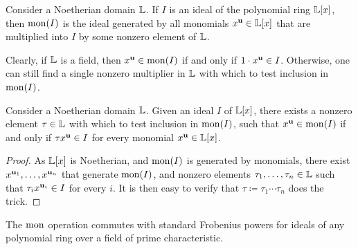 \documentclass{amsart}
\begin{document}
\begin{definition}
\label{monomialization: D}
Consider a Noetherian domain $\mathbb{L}$.  If $I$ is an ideal of the polynomial ring $\mathbb{L}[x]$, then $\operatorname{mon}(I)$ is the ideal generated by all monomials $x^{\mathbf{u}} \in \mathbb{L}[x]$ that are multiplied into $I$ by some nonzero element of $\mathbb{L}$.
\end{definition}

Clearly, if $\mathbb{L}$ is a field, then $x^{\mathbf{u}} \in \operatorname{mon}(I)$ if and only if $1 \cdot x^{\mathbf{u}} \in I$.  Otherwise, one can still find a single nonzero multiplier in $\mathbb{L}$ with which to test inclusion in $\operatorname{mon}(I)$.  

\begin{lemma}
\label{single multiplier: L}
  Consider a Noetherian domain $\mathbb{L}$.  Given an ideal $I$ of $\mathbb{L}[x]$, there exists a nonzero element $\tau \in \mathbb{L}$ with which to test inclusion in $\operatorname{mon}(I)$, \ie such that $x^{\mathbf{u}} \in \operatorname{mon}(I)$ if and only if $\tau x^{\mathbf{u}} \in I$ for every monomial $x^{\mathbf{u}} \in \mathbb{L}[x]$.
\end{lemma}

\begin{proof}  As $\mathbb{L}[x]$ is Noetherian, and $\operatorname{mon}(I)$ is generated by monomials, there exist $x^{\mathbf{u}_1}, \ldots, x^{\mathbf{u}_n}$ that generate $\operatorname{mon}(I)$, and nonzero elements $\tau_1, \ldots, \tau_n \in \mathbb{L}$ such that $\tau_i x^{\mathbf{u}_i} \in I$ for every $i$.  It is then easy to verify that $\tau\coloneqq \tau_1 \cdots \tau_n$ does the trick.
\end{proof}

\begin{lemma} 
\label{frobenius-powers+mon-commute: L}
The $\operatorname{mon}$ operation commutes with standard Frobenius powers for ideals of any polynomial ring over a field of prime characteristic. %
\end{lemma}
\end{document}
